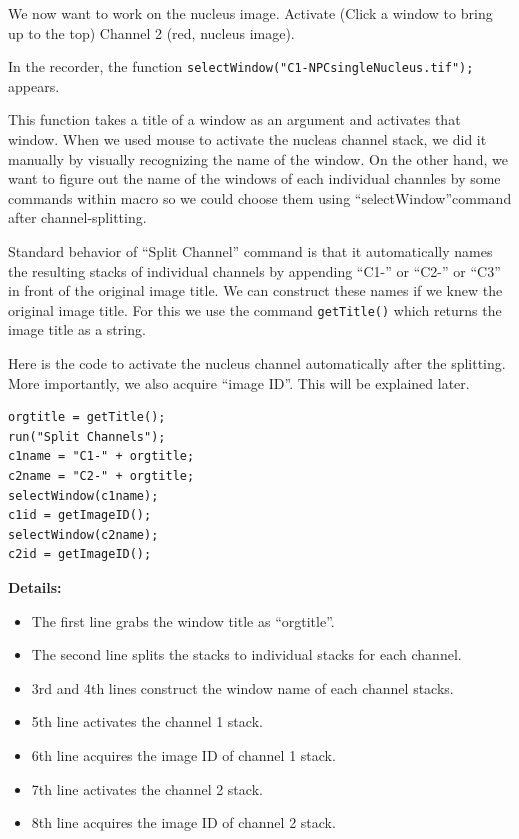 \documentclass[11pt,a4paper,oneside]{report}
\newcommand{\ilcom}[1]{\texttt{\small#1}}
\begin{document}
We now want to work on the nucleus image. Activate (Click a window to bring up to the top) Channel 2 (red, nucleus image).

In the recorder, the function \ilcom{selectWindow("C1-NPCsingleNucleus.tif");} appears. 


This function takes a title of a window as an argument and activates that window. When we used mouse to activate the nucleas channel stack, we did it manually by visually recognizing the name of the window. On the other hand, we want to figure out the name of the windows of each individual channles by some commands within macro so we could choose them using ``selectWindow''command after channel-splitting.  

Standard behavior of ``Split Channel'' command is that it automatically names the resulting stacks of individual channels by appending ``C1-'' or ``C2-'' or ``C3'' in front of the original image title. We can construct these names if we knew the original image title. For this we use the command \ilcom{getTitle()} which returns the image title as a string. 


Here is the code to activate the nucleus channel automatically after the splitting. More importantly, we also acquire ``image ID''. This will be explained later.  

\begin{lstlisting}
orgtitle = getTitle();
run("Split Channels");
c1name = "C1-" + orgtitle;
c2name = "C2-" + orgtitle;
selectWindow(c1name);
c1id = getImageID();
selectWindow(c2name);
c2id = getImageID();
\end{lstlisting}

\textbf{Details:} 
\begin{itemize}
\item The first line grabs the window title as ``orgtitle''. 
\item The second line splits the stacks to individual stacks for each channel.
\item 3rd and 4th lines construct the window name of each channel stacks. 
\item 5th line activates the channel 1 stack. 
\item 6th line acquires the image ID of channel 1 stack. 
\item 7th line activates the channel 2 stack. 
\item 8th line acquires the image ID of channel 2 stack. 
\end{itemize}
\end{document}
